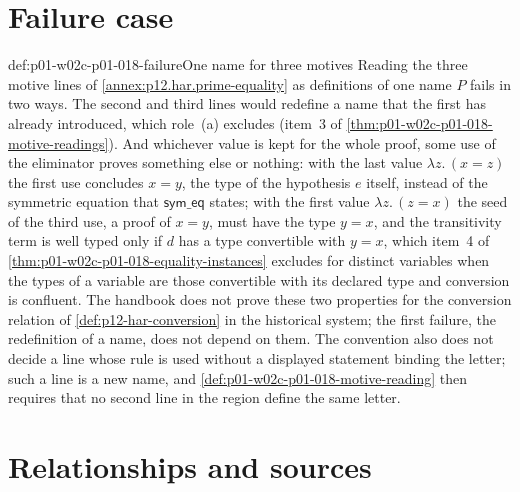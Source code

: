 \section{Failure case}
\label{sec:p01-w02c-p01-018-failure}

\begin{hbwarning}{def:p01-w02c-p01-018-failure}{One name for three motives}
Reading the three motive lines of \cref{annex:p12.har.prime-equality} as
definitions of one name \(P\) fails in two ways.  The second and third
lines would redefine a name that the first has already introduced, which
role~(a) excludes (item~3 of
\cref{thm:p01-w02c-p01-018-motive-readings}).  And whichever value is kept
for the whole proof, some use of the eliminator proves something else or
nothing: with the last value \(\lambda z.\,(x=z)\) the first use
concludes \(x=y\), the type of the hypothesis \(e\) itself, instead of the
symmetric equation that \(\mathsf{sym\_eq}\) states; with the first value
\(\lambda z.\,(z=x)\) the seed of the third use, a proof of \(x=y\), must
have the type \(y=x\), and the transitivity term is well typed only if
\(d\) has a type convertible with \(y=x\), which item~4 of
\cref{thm:p01-w02c-p01-018-equality-instances} excludes for distinct
variables when the types of a variable are those convertible with its
declared type and conversion is confluent.  The handbook does not prove
these two properties for the conversion relation of
\cref{def:p12-har-conversion} in the historical system; the first failure,
the redefinition of a name, does not depend on them.  The
convention also does not decide a line whose rule is used without a
displayed statement binding the letter; such a line is a new name, and
\cref{def:p01-w02c-p01-018-motive-reading} then requires that no second
line in the region define the same letter.
\end{hbwarning}

\section{Relationships and sources}
\label{sec:p01-w02c-p01-018-relationships}

